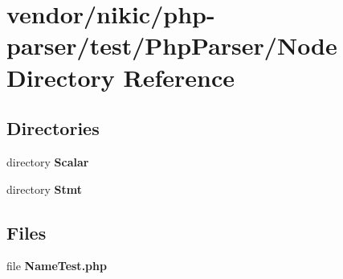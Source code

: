 \section{vendor/nikic/php-\/parser/test/\+Php\+Parser/\+Node Directory Reference}
\label{dir_3dc7ac4dd9fe00d80549d4b5c8ae9e60}
\subsection*{Directories}
\begin{DoxyCompactItemize}
\item 
directory {\bf Scalar}
\item 
directory {\bf Stmt}
\end{DoxyCompactItemize}
\subsection*{Files}
\begin{DoxyCompactItemize}
\item 
file {\bf Name\+Test.\+php}
\end{DoxyCompactItemize}
